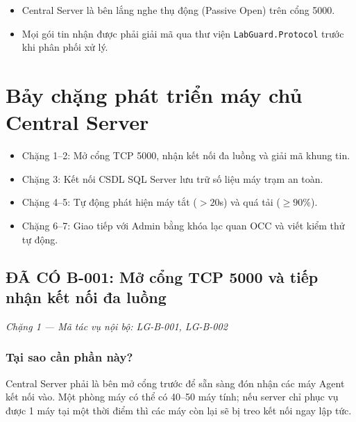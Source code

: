 \documentclass[12pt,a4paper]{article}
\begin{document}
\begin{takeawaybox}
\begin{itemize}[leftmargin=1.5em, itemsep=1pt]
  \item Central Server là bên lắng nghe thụ động (Passive Open) trên cổng 5000.
  \item Mọi gói tin nhận được phải giải mã qua thư viện \texttt{LabGuard.Protocol} trước khi phân phối xử lý.
\end{itemize}
\end{takeawaybox}

\section{Bảy chặng phát triển máy chủ Central Server}

\begin{summarybox}
\begin{itemize}[leftmargin=1.5em, itemsep=1pt]
  \item Chặng 1--2: Mở cổng TCP 5000, nhận kết nối đa luồng và giải mã khung tin.
  \item Chặng 3: Kết nối CSDL SQL Server lưu trữ số liệu máy trạm an toàn.
  \item Chặng 4--5: Tự động phát hiện máy tắt ($>20$s) và quá tải ($\ge 90\%$).
  \item Chặng 6--7: Giao tiếp với Admin bằng khóa lạc quan OCC và viết kiểm thử tự động.
\end{itemize}
\end{summarybox}

\subsection{ĐÃ CÓ B-001: Mở cổng TCP 5000 và tiếp nhận kết nối đa luồng}
{\footnotesize\color{lgGray}\textit{Chặng 1 — Mã tác vụ nội bộ: LG-B-001, LG-B-002}}\par
\vspace{2mm}

\subsubsection{Tại sao cần phần này?}
Central Server phải là bên mở cổng trước để sẵn sàng đón nhận các máy Agent kết nối vào. Một phòng máy có thể có 40--50 máy tính; nếu server chỉ phục vụ được 1 máy tại một thời điểm thì các máy còn lại sẽ bị treo kết nối ngay lập tức.
\end{document}

